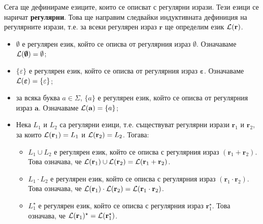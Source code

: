 Сега ще дефинираме езиците, които се описват с регулярни изрази.
Тези езици се наричат {\bf регулярни}.
Това ще направим следвайки индуктивната дефиниция на регулярните изрази,
т.е. за всеки регулярен израз $\mathbf{r}$ ще определим език $\mathcal{L}(\mathbf{r})$.
\begin{itemize}
\item
  $\emptyset$ е регулярен език,
  който се описва от регулярния израз $\bm{\emptyset}$. Означаваме $\mathcal{L}(\bm{\emptyset}) = \emptyset$;
\item
  $\{\varepsilon\}$ е регулярен език,
  който се описва от регулярния израз $\bm{\varepsilon}$.
  Означаваме $\mathcal{L}(\bm{\varepsilon}) = \{\varepsilon\}$;
\item
  за всяка буква $a \in \Sigma$, $\{a\}$ е регулярен език,
  който се описва от регулярния израз $\mathbf{a}$.
  Означаваме $\mathcal{L}(\mathbf{a}) = \{a\}$;
\item
  Нека $L_1$ и $L_2$ са регулярни езици, т.е. съществуват регулярни изрази $\mathbf{r}_1$
  и $\mathbf{r}_2$, за които $\mathcal{L}(\mathbf{r}_1) = L_1$ и $\mathcal{L}(\mathbf{r}_2) = L_2$.
  Тогава:
  \begin{itemize}
  \item 
    $L_1 \cup L_2$ е регулярен език, който се описва с регулярния израз $(\mathbf{r}_1 + \mathbf{r}_2)$.
    Това означава, че $\mathcal{L}(\mathbf{r}_1) \cup \mathcal{L}(\mathbf{r}_2) = \mathcal{L}(\mathbf{r}_1 + \mathbf{r}_2)$.
  \item
    $L_1 \cdot L_2$ е регулярен език, който се описва с регулярния израз $(\mathbf{r}_1 \cdot \mathbf{r}_2)$.
    Това означава, че $\mathcal{L}(\mathbf{r}_1) \cdot \mathcal{L}(\mathbf{r}_2) = \mathcal{L}(\mathbf{r}_1 \cdot \mathbf{r}_2)$.
  \item
    $L^\star_1$ е регулярен език, който се описва с регулярния израз $\mathbf{r}^\star_1$.
    Това означава, че $\mathcal{L}(\mathbf{r}_1)^\star = \mathcal{L}(\mathbf{r}^\star_1)$.
  \end{itemize}
\end{itemize}


